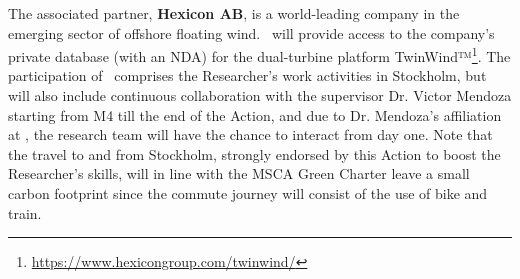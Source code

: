 The associated partner, \textbf{Hexicon AB}, is a world-leading company in the emerging sector of offshore floating wind. \Hexicon\ will provide access to the company's private database (with an NDA) for the dual-turbine platform TwinWind™\footnote{\url{https://www.hexicongroup.com/twinwind/}}. The participation of \Hexicon\ comprises the Researcher's work activities in Stockholm, but will also include continuous collaboration with the supervisor Dr. Victor Mendoza starting from M4 till the end of the Action, and due to Dr. Mendoza's affiliation at \UU, the research team will have the chance to interact from day one. Note that the travel to and from Stockholm, strongly endorsed by this Action to boost the Researcher's skills, will in line with the MSCA Green Charter leave a small carbon footprint since the commute journey will consist of the use of bike and train.


\label{sec:textend}